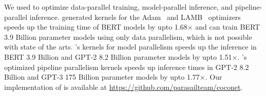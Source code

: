 We used \tool to optimize data-parallel training, model-parallel inference, and pipeline-parallel inference. 
\tool generated kernels for the Adam~\cite{adam} and LAMB~\cite{lamb} optimizers speeds up
the training time of BERT models by upto 1.68$\times$ and can train BERT 3.9 Billion parameter models using only data parallelism, which is not possible with state of the arts.
\tool's kernels for model parallelism speeds up the inference in BERT 3.9 Billion and GPT-2 8.2 Billion parameter models by upto 1.51$\times$.
\tool's optimized pipeline parallelism kernels speeds up inference times in GPT-2 8.2 Billion and GPT-3 175 Billion parameter models by upto 1.77$\times$.
Our implementation of \tool is available at \url{https://github.com/parasailteam/coconet}.